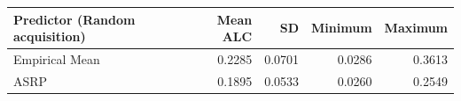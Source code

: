 \begin{tabular}{lrrrr}
\toprule
Predictor (Random acquisition) & Mean ALC & SD & Minimum & Maximum\\
\midrule
Empirical Mean & 0.2285 & 0.0701 & 0.0286 & 0.3613\\
ASRP & 0.1895 & 0.0533 & 0.0260 & 0.2549\\
\bottomrule
\end{tabular}
